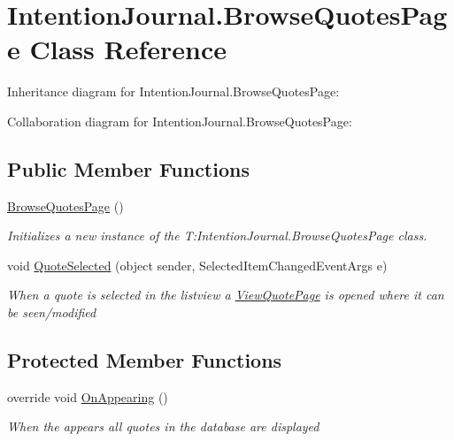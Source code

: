 \hypertarget{class_intention_journal_1_1_browse_quotes_page}{}\section{Intention\+Journal.\+Browse\+Quotes\+Page Class Reference}
\label{class_intention_journal_1_1_browse_quotes_page}


Inheritance diagram for Intention\+Journal.\+Browse\+Quotes\+Page\+:


Collaboration diagram for Intention\+Journal.\+Browse\+Quotes\+Page\+:
\subsection*{Public Member Functions}
\begin{DoxyCompactItemize}
\item 
\hyperlink{class_intention_journal_1_1_browse_quotes_page_a62be5f3a5834051d282baa28d26a8d9c}{Browse\+Quotes\+Page} ()
\begin{DoxyCompactList}\small\item\em Initializes a new instance of the T\+:\+Intention\+Journal.\+Browse\+Quotes\+Page class. \end{DoxyCompactList}\item 
void \hyperlink{class_intention_journal_1_1_browse_quotes_page_ab67be25647d0a7f8cc371d88d39c4411}{Quote\+Selected} (object sender, Selected\+Item\+Changed\+Event\+Args e)
\begin{DoxyCompactList}\small\item\em When a quote is selected in the listview a \hyperlink{class_intention_journal_1_1_view_quote_page}{View\+Quote\+Page} is opened where it can be seen/modified \end{DoxyCompactList}\end{DoxyCompactItemize}
\subsection*{Protected Member Functions}
\begin{DoxyCompactItemize}
\item 
override void \hyperlink{class_intention_journal_1_1_browse_quotes_page_ad5966051bc549bb89be3702a3876e435}{On\+Appearing} ()
\begin{DoxyCompactList}\small\item\em When the appears all quotes in the database are displayed \end{DoxyCompactList}\end{DoxyCompactItemize}


